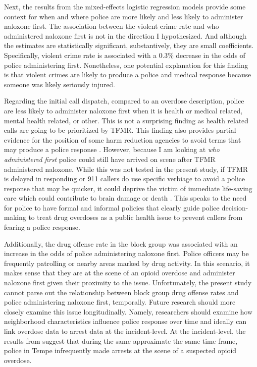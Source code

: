 Next, the results from the mixed-effects logistic regression models provide some context for when and where police are more likely and less likely to administer naloxone first. 
The association between the violent crime rate and who administered naloxone first is not in the direction I hypothesized. And although the estimates are statistically significant, substantively, they are small coefficients. Specifically, violent crime rate is associated with a 0.3\% decrease in the odds of police administering first. Nonetheless, one potential explanation for this finding is that violent crimes are likely to produce a police and medical response because someone was likely seriously injured. 

Regarding the initial call dispatch, compared to an overdose description, police are less likely to administer naloxone first when it is health or medical related, mental health related, or other. This is not a surprising finding as health related calls are going to be prioritized by TFMR. This finding also provides partial evidence for the position of some harm reduction agencies to avoid terms that may produce a police response \parencite{zagorski_how_2021}. However, because I am looking at \textit{who administered first} police could still have arrived on scene after TFMR administered naloxone. While this was not tested in the present study, if TFMR is delayed in responding or 911 callers do use specific verbiage to avoid a police response that may be quicker, it could deprive the victim of immediate life-saving care which could contribute to brain damage or death \parencite{winstanley_neurocognitive_2021}. This speaks to the need for police to have formal and informal policies that clearly guide police decision-making to treat drug overdoses as a public health issue to prevent callers from fearing a police response.

Additionally, the drug offense rate in the block group was associated with an increase in the odds of police administering naloxone first. Police officers may be frequently patrolling or nearby areas marked by drug activity. In this scenario, it makes sense that they are at the scene of an opioid overdose and administer naloxone first given their proximity to the issue. Unfortunately, the present study cannot parse out the relationship between block group drug offense rates and police administering naloxone first, temporally. Future research should more closely examine this issue longitudinally. Namely, researchers should examine how neighborhood characteristics influence police response over time and ideally can link overdose data to arrest data at the incident-level. At the incident-level, the results from \textcite{white_leveraging_2022} suggest that during the same approximate the same time frame, police in Tempe infrequently made arrests at the scene of a suspected opioid overdose.

